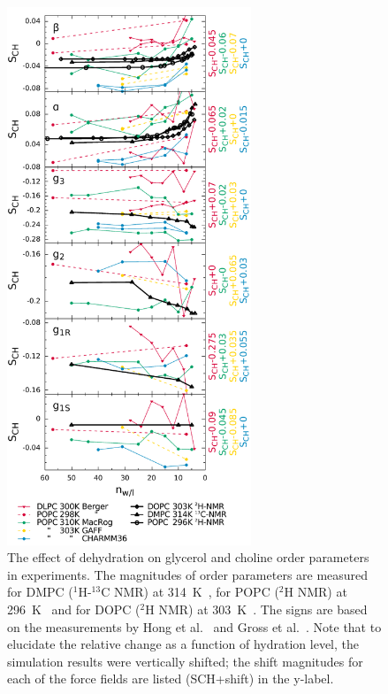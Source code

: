 \documentclass[journal=jacsat,manuscript=article]{achemso}
\begin{document}
\begin{figure}[]
  \centering
  \includegraphics[width=7.3cm]{../DATAreportediINblog/dehydration.pdf}
    \caption{\label{ordPhydr}
    The effect of dehydration on glycerol and choline order parameters in experiments.
    The magnitudes of order parameters are measured for DMPC ($^1$H-$^{13}$C NMR) at 314~K~\cite{dvinskikh05b}, 
    for POPC ($^2$H NMR) at 296~K~\cite{bechinger91} and for DOPC ($^2$H NMR) at 303~K~\cite{ulrich94}. 
    The signs are based on the measurements by Hong et al.~\cite{hong95a,hong95b} 
    and Gross et al.~\cite{gross97}.
    Note that to elucidate the relative change as a function of hydration level, the simulation results were vertically shifted; 
    the shift magnitudes for each of the force fields are listed (SCH+shift) in the y-label.
  }
\end{figure}
\end{document}
